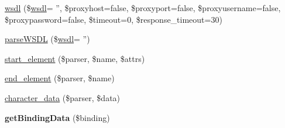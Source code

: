 \begin{DoxyCompactItemize}
\item 
\hyperlink{classwsdl_a4afbbf2bb8e2267a6387b17eb41597aa}{wsdl} (\$\hyperlink{classwsdl}{wsdl}= '', \$proxyhost=false, \$proxyport=false, \$proxyusername=false, \$proxypassword=false, \$timeout=0, \$response\-\_\-timeout=30)
\item 
\hyperlink{classwsdl_aef0643f32c7dca703065cc3eb3fd1dba}{parse\-W\-S\-D\-L} (\$\hyperlink{classwsdl}{wsdl}= '')
\item 
\hyperlink{classwsdl_abf9dc4b028eeac08eeca4c7309a950e2}{start\-\_\-element} (\$parser, \$name, \$attrs)
\item 
\hyperlink{classwsdl_ad45367c512cbc2d4679d1a49db3802f2}{end\-\_\-element} (\$parser, \$name)
\item 
\hyperlink{classwsdl_a592a4f9b601cc33f15de0ad7a9c49ae5}{character\-\_\-data} (\$parser, \$data)
\item 
\hypertarget{classwsdl_ae6385888eeb57e98ef81323b05842341}{{\bfseries get\-Binding\-Data} (\$binding)}\label{classwsdl_ae6385888eeb57e98ef81323b05842341}


\end{DoxyCompactItemize}

